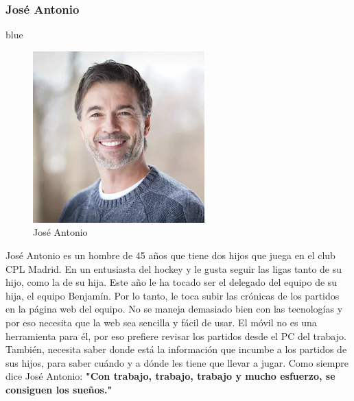 \documentclass[10pt, spanish, pdftex]{template/UC3M_document}
\begin{document}
\subsubsection{José Antonio}
\begin{boxAntonio}{}{blue}
  \begin{figure}
  \includegraphics[scale=1.5]{Images/Antonio.jpg}
  \caption{José Antonio}
  \end{figure}
  \small José Antonio es un hombre de 45 años que tiene dos hijos que juega en el club CPL Madrid. En un entusiasta del hockey y le gusta seguir las ligas tanto de su hijo, como la de su hija. Este año le ha tocado ser el delegado del equipo de su hija, el equipo Benjamín. Por lo tanto, le toca subir las crónicas de los partidos en la página web del equipo. No se maneja demasiado bien con las tecnologías y por eso necesita que la web sea sencilla y fácil de usar. El móvil no es una herramienta para él, por eso prefiere revisar los partidos desde el PC del trabajo. También, necesita saber donde está la información que incumbe a los partidos de sus hijos, para saber cuándo y a dónde les tiene que llevar a jugar. \break
  Como siempre dice José Antonio:
  \textbf{"Con trabajo, trabajo, trabajo y mucho esfuerzo, se consiguen los sueños."}
\end{boxAntonio} \hfill \break
\end{document}
